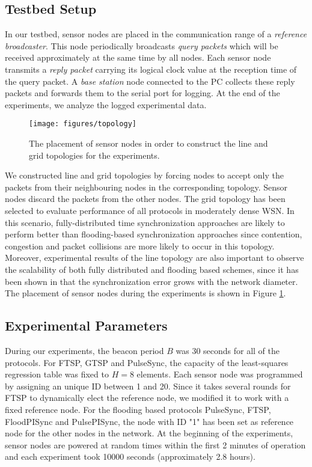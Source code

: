 \documentclass[english,a4paper,10pt,final]{article}
\numberwithin{equation}{section}
\numberwithin{figure}{section}
\begin{document}
\subsection{Testbed Setup}

In our testbed, sensor nodes are placed in the communication range of a \emph{reference broadcaster}. This node periodically broadcasts \emph{query packets} which will be received approximately at the same time by all nodes. Each sensor node transmits a \emph{reply packet} carrying its logical clock value at the reception time of the query packet. A \emph{base station} node connected to the PC collects these reply packets and forwards them to the serial port for logging. At the end of the experiments, we analyze the logged experimental data. 

\begin{figure}
\center

\texttt{[image: figures/topology]}

\caption{\label{fig:topology} The placement of sensor nodes in order to construct the line
and grid topologies for the experiments.}
\end{figure} 

We constructed line and grid topologies by forcing nodes to accept only the packets from their neighbouring nodes in the corresponding topology. Sensor nodes discard the packets from the other nodes. The grid topology has been selected to evaluate performance of all protocols in moderately dense WSN. In this scenario, fully-distributed time synchronization approaches are likely to perform better than flooding-based synchronization approaches since contention, congestion and packet collisions are more likely to occur in this topology. Moreover, experimental results of the line topology are also important to observe the scalability of both fully distributed and flooding based schemes, since it has been shown in \cite{Lenzen2009Optimal} that the synchronization error grows with the network diameter. The placement of sensor nodes during the experiments is shown in Figure \ref{fig:topology}.





\subsection{Experimental Parameters}

During our experiments, the beacon period $B$ was 30 seconds for all of the protocols. For FTSP, GTSP and PulseSync, the capacity of the least-squares regression table was fixed to $H=8$ elements. Each sensor node was programmed by assigning an unique ID between 1 and 20. Since it takes several rounds for FTSP to dynamically elect the reference node, we modified it to work with a fixed reference node. For the flooding based protocols PulseSync, FTSP, FloodPISync and PulsePISync, the node with ID "1" has been set as reference node for the other nodes in the network. At the beginning of the experiments, sensor nodes are powered at random times within the first 2 minutes of operation and each experiment took 10000 seconds (approximately 2.8 hours).
\end{document}
